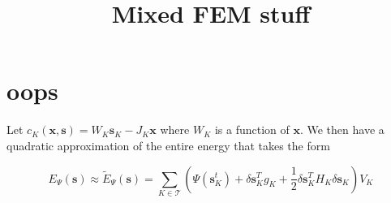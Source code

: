 \documentclass[letterpaper,12pt]{article}
\theoremstyle{remark}
\newcommand{\Th}{\mathcal{T}}
\newcommand{\x}{\mathbf{x}}
\newcommand{\s}{\mathbf{s}}
\newcommand{\ds}{\delta \s}
\begin{document}
\title{Mixed FEM stuff}
\date{}
\maketitle





\section{oops}
Let $c_K(\x,\s) = W_K \s_K - J_K \x$ where $W_K$ is a function of $\x$. We then have a quadratic approximation of the entire energy that takes the form

\begin{equation}
E_\Psi (\s) \approx \tilde{E}_\Psi (\s) = \sum_{K \in \Th} \left(\Psi(\s_K^t) + \ds_K^T g_K + \frac{1}{2}\ds_K^T H_K \ds_K \right) V_K
\end{equation}
\end{document}
